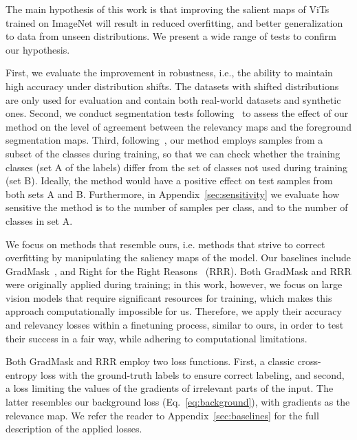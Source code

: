\documentclass{article}
\begin{document}
The main hypothesis of this work is that improving the salient maps of ViTs trained on ImageNet will result in reduced overfitting, and better generalization to data from unseen distributions. We present a wide range of tests to confirm our hypothesis. 

First, we evaluate the improvement in robustness, i.e., the ability to maintain high accuracy under distribution shifts. 
The datasets with shifted distributions are only used for evaluation and contain both real-world datasets and synthetic ones. 
Second, we conduct segmentation tests following~\cite{chefer2020transformer} to assess the effect of our method on the level of agreement between the relevancy maps and the foreground segmentation maps.
Third, following~\cite{yosinski2014transferable}, our method employs samples from a subset of the classes during training, so that we can check whether the training classes (set A of the labels) differ from the set of classes not used during training (set B). Ideally, the method would have a positive effect on test samples from both sets A and B. 
Furthermore, in Appendix~\ref{sec:sensitivity} we evaluate how sensitive the method is to the number of samples per class, and to the number of classes in set A.

We focus on methods that resemble ours, i.e. methods that strive to correct overfitting by manipulating the saliency maps of the model. Our baselines include GradMask~\cite{Simpson2019GradMaskRO}, and Right for the Right Reasons~\cite{Ross2017RightFT} (RRR). Both GradMask and RRR were originally applied during training; in this work, however, we focus on large vision models that require significant resources for training, which makes this approach computationally impossible for us. Therefore, we apply their accuracy and relevancy losses within a finetuning process, similar to ours, in order to test their success in a fair way, while adhering to  computational limitations.

Both GradMask and RRR employ two loss functions. First, a classic cross-entropy loss with the ground-truth labels to ensure correct labeling, and second, a loss limiting the values of the gradients of irrelevant parts of the input. The latter resembles our background loss (Eq.~\ref{eq:background}), with gradients as the relevance map. We refer the reader to Appendix~\ref{sec:baselines} for the full description of the applied losses.
\end{document}
